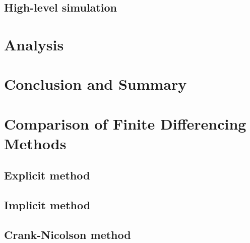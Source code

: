\documentclass[letterpaper,titlepage,oneside]{report}
\begin{document}
\section{High-level simulation}

\chapter{Analysis}
\label{ch:analysis}

\chapter{Conclusion and Summary}
\label{ch:conclusion}

\appendix


\chapter{Comparison of Finite Differencing Methods}
\label{ch:finitediff}

\section{Explicit method}

\section{Implicit method}

\section{Crank-Nicolson method}
\end{document}
